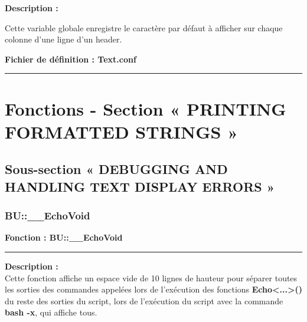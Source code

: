 \documentclass[a4paper,10pt]{article}
\begin{document}
\begin{justify}\setlength{\parskip}{2em}
    \textbf{Description :}
\end{justify}\setlength{\parskip}{1em}

\begin{justify}
    Cette variable globale enregistre le caractère par défaut à afficher sur chaque colonne d'une ligne d'un header.
\end{justify}

\textbf{Fichier de définition : \color{lime}Text.conf}\\[1\baselineskip]





\color{red}\par\noindent\rule{\textwidth}{0.4pt}\color{white}

\color{red}
\section{Fonctions - Section « PRINTING FORMATTED STRINGS »}\color{white}

\color{green}
\subsection{Sous-section « DEBUGGING AND HANDLING TEXT DISPLAY ERRORS »}\color{white}

\color{blue}
\subsubsection{BU::\_\_EchoVoid}\color{white}

\textbf{Fonction : \color{mauve}BU::\_\_EchoVoid}\setlength{\parskip}{1em}

\par\noindent\rule{\textwidth}{0.4pt}

\begin{justify}
    \textbf{Description :}\\[1\baselineskip]
    Cette fonction affiche un espace vide de 10 lignes de hauteur pour séparer toutes les sorties des commandes appelées lors de l'exécution des fonctions \textbf{\color{mauve}Echo<...>()} du reste des sorties du script, lors de l'exécution du script avec la commande \textbf{\color{gray}bash -x}, qui affiche tous.
\end{justify}
\end{document}
